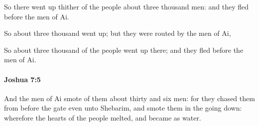 			\begin{versebox}
					\item[BHS] 
					\item[ASV] So there went up thither of the people about three thousand men: and they fled before the men of Ai.
					\item[NIV] So about three thousand went up; but they were routed by the men of Ai,
					\item[NRSV] So about three thousand of the people went up there; and they fled before the men of Ai.
			\end{versebox}

		\paragraph{Joshua 7:5} %
			\label{JOSHUA-7-5}

			And the men of Ai smote of them about thirty and six men: for they chased them from before the gate even unto Shebarim, and smote them in the going down: wherefore the hearts of the people melted, and became as water.

